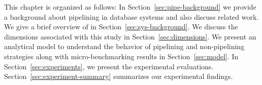 This chapter is organized as follows: In Section~\ref{sec:pipe-background} we provide a background about pipelining in database systems and also discuss related work.
We give a brief overview of \sys{} in Section~\ref{sec:sys-background}.
We discuss the dimensions associated with this study in Section~\ref{sec:dimensions}.
We present an analytical model to understand the behavior of pipelining and non-pipelining strategies along with micro-benchmarking results in Section~\ref{sec:model}.
In Section~\ref{sec:experiments}, we present the experimental evaluations.
Section~\ref{sec:experiment-summary} summarizes our experimental findings.
